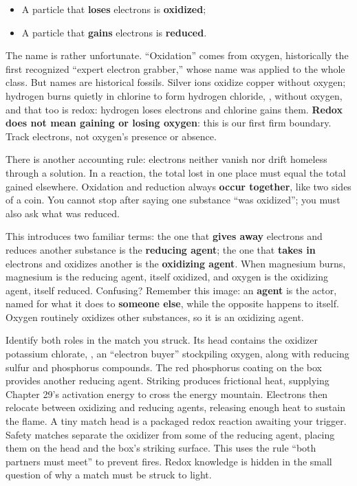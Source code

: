 \begin{itemize}[itemsep=2pt]
\item A particle that \textbf{loses} electrons is \textbf{oxidized};
\item A particle that \textbf{gains} electrons is \textbf{reduced}.
\end{itemize}

The name is rather unfortunate. ``Oxidation'' comes from oxygen, historically the first recognized ``expert electron grabber,'' whose name was applied to the whole class. But names are historical fossils. Silver ions oxidize copper without oxygen; hydrogen burns quietly in chlorine to form hydrogen chloride, , without oxygen, and that too is redox: hydrogen loses electrons and chlorine gains them. \textbf{Redox does not mean gaining or losing oxygen}: this is our first firm boundary. Track electrons, not oxygen's presence or absence.

There is another accounting rule: electrons neither vanish nor drift homeless through a solution. In a reaction, the total lost in one place must equal the total gained elsewhere. Oxidation and reduction always \textbf{occur together}, like two sides of a coin. You cannot stop after saying one substance ``was oxidized''; you must also ask what was reduced.

This introduces two familiar terms: the one that \textbf{gives away} electrons and reduces another substance is the \textbf{reducing agent}; the one that \textbf{takes in} electrons and oxidizes another is the \textbf{oxidizing agent}. When magnesium burns, magnesium is the reducing agent, itself oxidized, and oxygen is the oxidizing agent, itself reduced. Confusing? Remember this image: an \textbf{agent} is the actor, named for what it does to \textbf{someone else}, while the opposite happens to itself. Oxygen routinely oxidizes other substances, so it is an oxidizing agent.

Identify both roles in the match you struck. Its head contains the oxidizer potassium chlorate, , an ``electron buyer'' stockpiling oxygen, along with reducing sulfur and phosphorus compounds. The red phosphorus coating on the box provides another reducing agent. Striking produces frictional heat, supplying Chapter 29's activation energy to cross the energy mountain. Electrons then relocate between oxidizing and reducing agents, releasing enough heat to sustain the flame. A tiny match head is a packaged redox reaction awaiting your trigger. Safety matches separate the oxidizer from some of the reducing agent, placing them on the head and the box's striking surface. This uses the rule ``both partners must meet'' to prevent fires. Redox knowledge is hidden in the small question of why a match must be struck to light.

